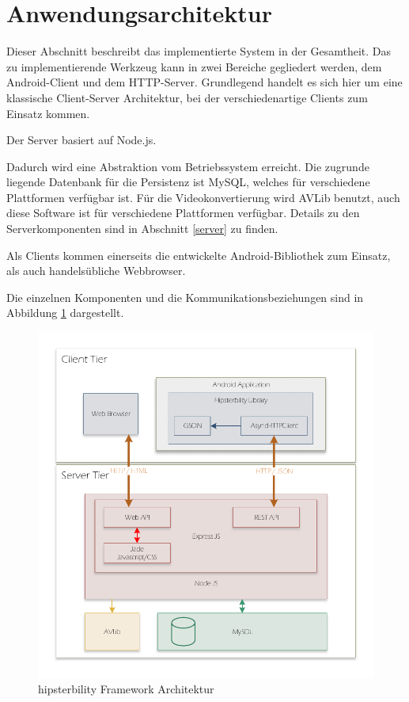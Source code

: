 \section{Anwendungsarchitektur}
\label{app_architecture}
Dieser Abschnitt beschreibt das implementierte System in der Gesamtheit. Das zu implementierende Werkzeug kann in zwei Bereiche gegliedert werden, dem Android-Client und dem HTTP-Server. 
Grundlegend handelt es sich hier um eine klassische Client-Server Architektur, bei der verschiedenartige Clients zum Einsatz kommen.

Der Server basiert auf Node.js.

Dadurch wird eine Abstraktion vom Betriebssystem erreicht.
Die zugrunde liegende Datenbank für die Persistenz ist MySQL, welches für verschiedene Plattformen verfügbar ist.
Für die Videokonvertierung wird AVLib benutzt, auch diese Software ist für verschiedene Plattformen verfügbar. Details zu den Serverkomponenten sind in Abschnitt \ref{server} zu finden.

Als Clients kommen einerseits die entwickelte Android-Bibliothek zum Einsatz, als auch handelsübliche Webbrowser.

Die einzelnen Komponenten und die Kommunikationsbeziehungen sind in Abbildung \ref{fig:architecture} dargestellt.

\begin{figure}[htb]
	\centering
	\includegraphics[width=0.75\linewidth]{img/architecture}
	\caption{hipsterbility Framework Architektur\label{fig:architecture}}
\end{figure}

